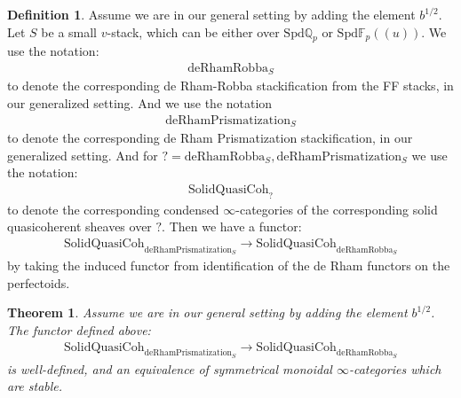 \documentclass[12pt]{article}
\newtheorem{theorem}{Theorem}
\theoremstyle{definition}
\newtheorem{definition}{Definition}
\begin{document}
\begin{definition}
Assume we are in our general setting by adding the element $b^{1/2}$. Let $S$ be a small $v$-stack, which can be either over $\mathrm{Spd}\mathbb{Q}_p$ or $\mathrm{Spd}\mathbb{F}_p((u))$. We use the notation:
\begin{align}
\mathrm{deRhamRobba}_S
\end{align}
to denote the corresponding de Rham-Robba stackification from the FF stacks, in our generalized setting. And we use the notation
\begin{align}
\mathrm{deRhamPrismatization}_S
\end{align}
to denote the corresponding de Rham Prismatization stackification, in our generalized setting. And for $?= \mathrm{deRhamRobba}_S, \mathrm{deRhamPrismatization}_S$ we use the notation:
\begin{align}
\mathrm{SolidQuasiCoh}_?
\end{align}
to denote the corresponding condensed $\infty$-categories of the corresponding solid quasicoherent sheaves over $?$. Then we have a functor:
\begin{align}
\mathrm{SolidQuasiCoh}_{\mathrm{deRhamPrismatization}_S}\rightarrow \mathrm{SolidQuasiCoh}_{\mathrm{deRhamRobba}_S}
\end{align}
by taking the induced functor from identification of the de Rham functors on the perfectoids.
\end{definition}


\begin{theorem}
Assume we are in our general setting by adding the element $b^{1/2}$. The functor defined above:
\begin{align}
\mathrm{SolidQuasiCoh}_{\mathrm{deRhamPrismatization}_S}\rightarrow \mathrm{SolidQuasiCoh}_{\mathrm{deRhamRobba}_S}
\end{align}
is well-defined, and an equivalence of symmetrical monoidal $\infty$-categories which are stable.

\end{theorem}
\end{document}
